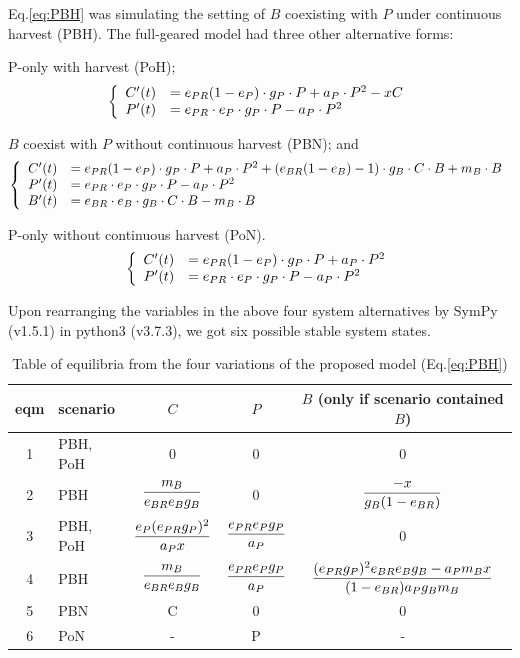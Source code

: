 \documentclass[../thesis.tex]{subfiles} %
\begin{document}
Eq.\ref{eq:PBH} was simulating the setting of $B$ coexisting with $P$ under continuous harvest (PBH).  The full-geared model had three other alternative forms:

P-only with harvest (PoH);
\begin{equation}\left\{\begin{array}{rl}
    C'(t) &= e_{PR}(1-e_P)\cdot g_P\cdot P +a_P\cdot P^2 -xC\\
    P'(t) &= e_{PR}\cdot e_P\cdot g_P\cdot P -a_P\cdot P^2
\end{array}\right.\label{eq:PoH}\end{equation}

$B$ coexist with $P$ without continuous harvest (PBN); and
\begin{equation}\left\{\begin{array}{rl}
    C'(t) &= e_{PR}(1-e_P)\cdot g_P\cdot P +a_P\cdot P^2 +(e_{BR}(1-e_B)-1)\cdot g_B\cdot C\cdot B +m_B\cdot B\\
    P'(t) &= e_{PR}\cdot e_P\cdot g_P\cdot P -a_P\cdot P^2\\
    B'(t) &= e_{BR}\cdot e_B\cdot g_B\cdot C\cdot B -m_B\cdot B
\end{array}\right.\label{eq:PBN}\end{equation}

P-only without continuous harvest (PoN).
\begin{equation}\left\{\begin{array}{rl}
    C'(t) &= e_{PR}(1-e_P)\cdot g_P\cdot P +a_P\cdot P^2\\
    P'(t) &= e_{PR}\cdot e_P\cdot g_P\cdot P -a_P\cdot P^2
\end{array}\right.\label{eq:PoN}\end{equation}

Upon rearranging the variables in the above four system alternatives by SymPy (v1.5.1) in python3 (v3.7.3), we got six possible stable system states.

\begin{table}[H]
    \centering
    \caption{Table of equilibria from the four variations of the proposed model (Eq.\ref{eq:PBH})}
    \begin{tabular}{cl|ccc}\hline
        eqm & scenario & $C$ & $P$ & $B$ (only if scenario contained $B$) \\\hline
        1 & PBH, PoH & 0 & 0 & 0 \\
        2 & PBH & $\dfrac{m_B}{e_{BR}e_Bg_B}$ & 0 & $\dfrac{-x}{g_B(1-e_{BR})}$ \\
        3 & PBH, PoH & $\dfrac{e_P(e_{PR}g_P)^2}{a_P x}$ & $\dfrac{e_{PR}e_Pg_P}{a_P}$ & 0 \\
        4 & PBH & $\dfrac{m_B}{e_{BR}e_Bg_B}$ & $\dfrac{e_{PR}e_Pg_P}{a_P}$ & $\dfrac{(e_{PR}g_P)^2e_{BR}e_Bg_B-a_Pm_B x}{(1-e_{BR})a_Pg_Bm_B}$ \\
        5 & PBN & C & 0 & 0 \\
        6 & PoN & - & P & - \\\hline
    \end{tabular}
    \label{t:eqm}
\end{table}
\end{document}

